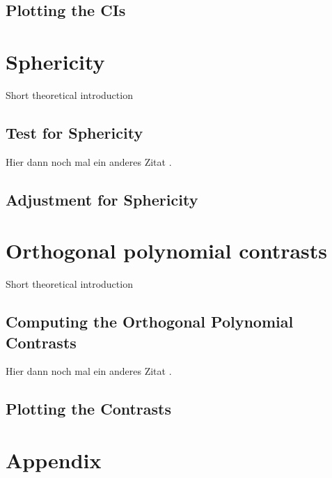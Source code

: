 \documentclass[11pt]{article}
\begin{document}
		\subsection{Plotting the CIs}
		
	\section{Sphericity}
	Short theoretical introduction
		\subsection{Test for Sphericity}
		Hier dann noch mal ein anderes Zitat \citep{003}.
		\subsection{Adjustment for Sphericity}
	
	\section{Orthogonal polynomial contrasts}
	Short theoretical introduction
		\subsection{Computing the Orthogonal Polynomial Contrasts}
		Hier dann noch mal ein anderes Zitat \citep{003}.
		\subsection{Plotting the Contrasts}
	

 
	\section*{Appendix}
	\newpage
 
 
 
	
\end{document}
